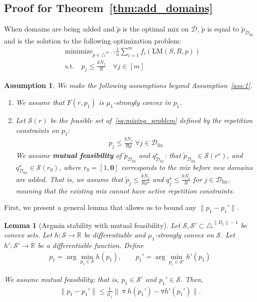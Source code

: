 \documentclass[table]{ai2style/ai2}
\newtheorem{lemma}{Lemma}
\newtheorem{assumption}{Assumption}
\newcommand{\D}[0]{\mathcal{D}}
\newcommand{\R}[0]{\mathbb{R}}
\newcommand{\LM}[0]{\text{LM}}
\newcommand{\Dfix}[0]{\mathcal{D}_{\text{fix}}}
\begin{document}
\subsection{Proof for Theorem~\ref{thm:add_domains}}\label{supp:add_domains_proof}

When domains are being added and $\tilde{p}$ is the optimal mix on $\D$, $\tilde{p}$ is equal to $\tilde{p}_{\Dfix}$ and is the solution to the following optimization problem:
\begin{align}
    &\text{minimize}_{p \in \triangle^{m-1}}  \frac{1}{n} \sum_{i = 1}^m f_i(\LM(S, R, p))
    \label{eq:p_mixing_problem} \\
    &\text{s.t.} \quad  p_j \le \frac{k N_j}{R} \quad \forall j \in [m] \nonumber
\end{align}

\begin{assumption}\label{ass:2}
We make the following assumptions beyond Assumption~\ref{ass:1}.
\begin{enumerate}
    \item We assume that $F(r, p_1)$ is $\mu_1$-strongly convex in $p_1$.
    \item Let $\mathcal{S}(r)$ be the feasible set of~\eqref{eq:mixing_problem} defined by the repetition constraints on $p_1$:
    \begin{align*}
        p_j \le \frac{k N_j}{R \rho} \; \forall j \in \Dfix
    \end{align*}
    We assume \textbf{mutual feasibility} of $\tilde{p}_{\Dfix}$ and $q^\star_{\Dfix}$:
    that $\tilde{p}_{\Dfix} \in \mathcal{S}(r^\star)$, and $q^\star_{\Dfix} \in \mathcal{S}(r_0)$, where $r_0 = [1, \mathbf{0}]$ corresponds to the mix before new domains are added. That is, we assume that $\tilde{p}_j \le \frac{k N_j}{R \rho^\star}$ and $q^\star_j \le \frac{k N_j}{R}$ for $j \in \Dfix$, meaning that the existing mix cannot have active repetition constraints.
\end{enumerate}
    
\end{assumption}

First, we present a general lemma that allows us to bound any $\|p_1 - p_1'\|$.

\begin{lemma}[Argmin stability with mutual feasibility]\label{lem:argmin_stability_mutual}
Let $\mathcal{S}, \mathcal{S}' \subset \triangle^{\|D_1\| - 1}$ be convex sets. Let $h: \mathcal{S} \rightarrow \R$ be differentiable and $\mu_1$-strongly convex on $\mathcal{S}$. Let $h': \mathcal{S}' \rightarrow \R$ be a differentiable function. Define
\begin{align*}
    p_1 = \arg\min_{p_1 \in \mathcal{S}} h(p_1), \qquad p_1' = \arg\min_{p_1 \in \mathcal{S}'} h'(p_1)
\end{align*}

We assume mutual feasibility; that is, $p_1 \in \mathcal{S}'$ and $p_1' \in \mathcal{S}$. Then,
\begin{align*}
    \|p_1 - p_1'\| \le \frac{1}{\mu_1} \|\triangledown h(p_1') - \triangledown h'(p_1') \|.
\end{align*}
\end{lemma}
\end{document}
